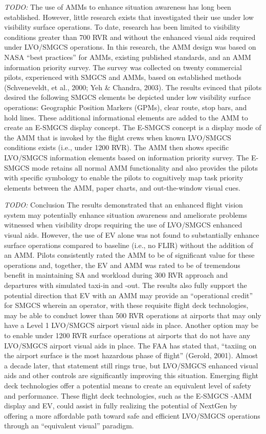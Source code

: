 \documentclass[utf8,bachelor,manualbib]{gradu3}
\begin{document}
\emph{TODO:}
The use of AMMs to enhance situation awareness has long been established. However, little research exists that
investigated their use under low visibility surface operations. To date, research has been limited to visibility
conditions greater than 700 RVR and without the enhanced visual aids required under LVO/SMGCS operations.
In this research, the AMM design was based on NASA “best practices” for AMMs, existing published standards,
and an AMM information priority survey. The survey was collected on twenty commercial pilots, experienced with
SMGCS and AMMs, based on established methods (Schveneveldt, et al., 2000; Yeh \& Chandra, 2003). The results
evinced that pilots desired the following SMGCS elements be depicted under low visibility surface operations: Geographic Position Markers (GPMs), clear route, stop bars, and hold lines. These additional informational elements are added to the AMM to create an E-SMGCS display concept.
The E-SMGCS concept is a display mode of the AMM that is invoked by the flight crews when known LVO/SMGCS conditions exists (i.e., under 1200 RVR). The AMM then shows specific LVO/SMGCS information elements based on information priority survey. The E-SMGCS mode retains all normal AMM functionality and also provides the pilots with specific symbology to enable the pilots to cognitively map task priority elements between the AMM, paper charts, and out-the-window visual cues.

\emph{TODO:}
Conclusion
The results demonstrated that an enhanced flight vision system may potentially enhance situation awareness and ameliorate problems witnessed when visibility drops requiring the use of LVO/SMGCS enhanced visual aids. However, the use of EV alone was not found to substantially enhance surface operations compared to baseline (i.e., no FLIR) without the addition of an AMM. Pilots consistently rated the AMM to be of significant value for these operations and, together, the EV and AMM was rated to be of tremendous benefit in maintaining SA and workload during 300 RVR approach and departures with simulated taxi-in and -out. The results also fully support the potential direction that EV with an AMM may provide an “operational credit” for SMGCS wherein an operator, with these requisite flight deck technologies, may be able to conduct lower than 500 RVR operations at airports that may only have a Level 1 LVO/SMGCS airport visual aids in place. Another option may be to enable under 1200 RVR surface operations at airports that do not have any LVO/SMGCS airport visual aids in place.
The FAA has stated that, “taxiing on the airport surface is the most hazardous phase of flight” (Gerold, 2001). Almost a decade later, that statement still rings true, but LVO/SMGCS enhanced visual aids and other controls are significantly improving this situation. Emerging flight deck technologies offer a potential means to create an equivalent level of safety and performance. These flight deck technologies, such as the E-SMGCS -AMM display and EV, could assist in fully realizing the potential of NextGen by offering a more affordable path toward safe and efficient LVO/SMGCS operations through an “equivalent visual” paradigm. \citep{prinzel2013}
\end{document}
